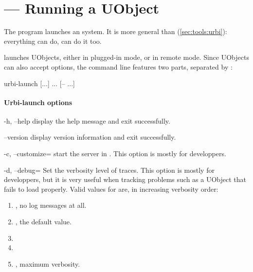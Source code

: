 \section{ --- Running a UObject}
\label{sec:tools:urbi-launch}

The  program launches an \urbi system.  It is
more general than  (\autoref{sec:tools:urbi}):
everything  can do,  can do it too.

 launches UObjects, either in plugged-in mode, or
in remote mode.  Since UObjects can also accept options, the command
line features two parts, separated by \samp{--}:

\begin{shell}
urbi-launch [...] ... [-- ...]
\end{shell}

\paragraph{Urbi-launch options}
\begin{options}
\item[-h, --help] display the help message and exit successfully.
\item[--version] display version information and exit successfully.
\item[-c, --customize=\var{file}] start the \urbi server in
  .  This option is mostly for developpers.
\item[-d, --debug=\var{level}] Set the verbosity level of traces.
  This option is mostly for developpers, but it is very useful when
  tracking problems such as a UObject that fails to load properly.
  Valid values for  are, in increasing verbosity order:
  \begin{enumerate}
  \item {}, no log messages at all.
  \item {}, the default value.
  \item {}
  \item {}
  \item {}, maximum verbosity.
  \end{enumerate}
\end{options}

